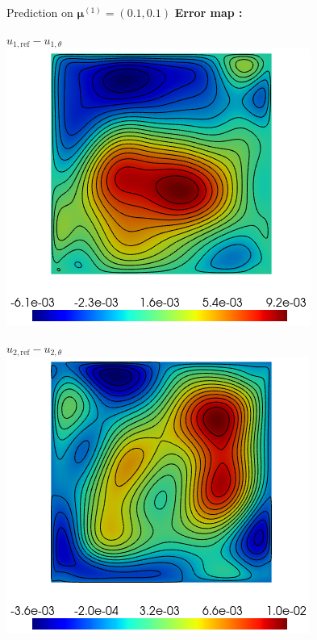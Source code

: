 \begin{frame}{Prediction on $\bm{\mu}^{(1)} = (0.1,0.1)$}
    \textbf{Error map :} \begin{minipage}{0.26\linewidth}
        \centering
        $u_{1,\text{ref}}-u_{1,\theta}$ \\
        \includegraphics[width=0.95\linewidth]{images/pinn/training/PINN_error_plot_case4_v2_param1_u1.png}
    \end{minipage} \; \begin{minipage}{0.26\linewidth}
        \centering
        $u_{2,\text{ref}}-u_{2,\theta}$ \\
        \includegraphics[width=0.95\linewidth]{images/pinn/training/PINN_error_plot_case4_v2_param1_u2.png}

\end{minipage}
\end{frame}

